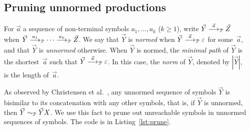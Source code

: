 \subsection{Pruning unnormed productions}
\label{subsec:prune}

For $\vec a$ a sequence of non-terminal symbols $a_1,\ldots, a_k$
($k\ge1$), write $\vec Y \LTSderivesP[\vec a] \vec Z$ when
$\vec Y \LTSderivesP[a_1] \cdots \LTSderivesP[a_k] \vec Z$.
%
We say that $\vec Y$ is \emph{normed} when
$\vec Y \LTSderivesP[\vec a] \varepsilon$ for some~$\vec a$, and that
$\vec Y$ is \emph{unnormed} otherwise.
%
When $\vec Y$ is normed, the \emph{minimal path} of $\vec Y$ is the
shortest~$\vec a$ such that $\vec Y \LTSderivesP[\vec a]
\varepsilon$.
%
In this case, the \emph{norm} of $\vec Y$, denoted by $|\vec Y|$, is
the length of~$\vec a$.


As observed by Christensen et
al.~\cite{DBLP:journals/iandc/ChristensenHS95}, any unnormed sequence
of symbols $\vec Y$ is bisimilar to its concatenation with any other
symbols, that is, if $\vec Y$ is unnormed, then
$\vec Y \ProdEquiv \vec YX$.
%
%
We use this fact
to prune out unreachable symbols in unnormed sequences of symbols. The
code is in Listing~\ref{lst:prune}. 

